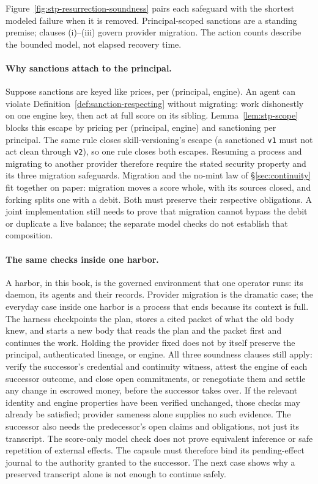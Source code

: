 \documentclass[11pt,a4paper]{article}
\theoremstyle{definition}
\begin{document}
Figure~\ref{fig:stp-resurrection-soundness} pairs each safeguard with the
shortest modeled failure when it is removed. Principal-scoped sanctions are a
standing premise; clauses (i)--(iii) govern provider migration. The action
counts describe the bounded model, not elapsed recovery time.



\paragraph{Why sanctions attach to the principal.} Suppose sanctions are
keyed like prices, per (principal, engine). An agent can violate
Definition~\ref{def:sanction-respecting} without migrating: work dishonestly
on one engine key, then act at full score on its sibling. Lemma~\ref{lem:stp-scope}
blocks this escape by pricing per (principal, engine) and sanctioning per
principal. The same rule closes
skill-versioning's escape (a sanctioned \texttt{v1} must not act clean through
\texttt{v2}), so one rule closes both escapes. Resuming a process and migrating to another provider
therefore require the stated security property and its three migration
safeguards. Migration and the no-mint law of
\S\ref{sec:continuity} fit together on paper: migration moves a score whole, with its
sources closed, and forking splits one with a debit. Both must preserve their respective obligations. A joint implementation still
needs to prove that migration cannot bypass the debit or duplicate a live
balance; the separate model checks do not establish that composition.

\paragraph{The same checks inside one harbor.} A harbor, in this book, is the
governed environment that one operator runs: its daemon, its agents and their
records. Provider migration is the dramatic case; the everyday case inside one
harbor is a process that ends because its context is full. The harness checkpoints the plan, stores a cited packet of what the old
body knew, and starts a new body that reads the plan and the packet first and
continues the work. Holding the provider fixed does not by itself preserve
the principal, authenticated lineage, or engine. All three soundness clauses
still apply: verify the successor's credential and continuity witness, attest
the engine of each successor outcome, and close open commitments, or
renegotiate them and settle any change in escrowed money, before the successor
takes over. If the relevant identity and
engine properties have been verified unchanged, those checks may already be
satisfied; provider sameness alone supplies no such evidence. The successor
also needs the predecessor's open claims and obligations, not just its
transcript. The score-only model check does not prove equivalent inference or
safe repetition of external effects. The capsule must therefore bind its pending-effect journal to the authority
granted to the successor. The next case shows why a preserved transcript alone is not
enough to continue safely.
\end{document}
